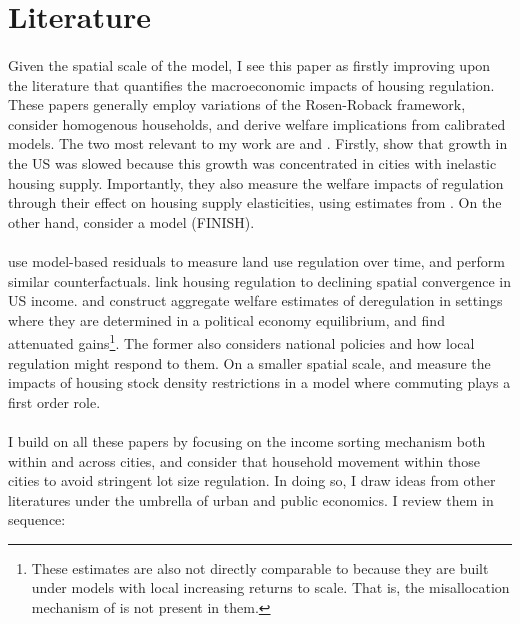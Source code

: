 \section{Literature}
\paragraph*{}
Given the spatial scale of the model, I see this paper as firstly improving upon the literature that quantifies the macroeconomic impacts of housing regulation. These papers generally employ variations of the Rosen-Roback framework, consider homogenous households, and derive welfare implications from calibrated models. The two most relevant to my work are \cite{hseihmoretti} and \cite{durantonpugaurbgrowth}. Firstly, \cite{hseihmoretti} show that growth in the US was slowed because this growth was concentrated in cities with inelastic housing supply. Importantly, they also measure the welfare impacts of regulation through their effect on housing supply elasticities, using estimates from \cite{saiz2010}. On the other hand, \cite{durantonpugaurbgrowth} consider a model (FINISH). 
\paragraph*{}
\cite*{hop} use model-based residuals to measure land use regulation over time, and perform similar counterfactuals. \cite{ganongshoag} link housing regulation to declining spatial convergence in US income. \cite{parkho} and \cite{bunten} construct aggregate welfare estimates of deregulation in settings where they are determined in a political economy equilibrium, and find attenuated gains\footnote{These estimates are also not directly comparable to \cite{hseihmoretti} because they are built under models with local increasing returns to scale. That is, the misallocation mechanism of \cite{hseihmoretti} is not present in them.}.  The former also considers national policies and how local regulation might respond to them. On a smaller spatial scale, \cite{martynov} and \cite{acosta} measure the impacts of housing stock density restrictions in a model where commuting plays a first order role. 

\paragraph*{}
I build on all these papers by focusing on the income sorting mechanism both within and across cities, and consider that household movement within those cities to avoid stringent lot size regulation. In doing so, I draw ideas from other literatures under the umbrella of urban and public economics. I review them in sequence:

